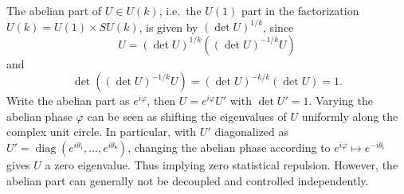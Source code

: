 \begin{remark}
  The abelian part of $U ∈ U(k)$, i.e.\ the $U(1)$ part in the factorization $U(k) = U(1) × SU(k)$, is given by $(\det U)^{1/k}$, since
  \begin{equation}
    U = (\det U)^{1/k} \left( (\det U)^{-1/k} U \right)
  \end{equation}
  and
  \begin{equation}
    \det \left( (\det U)^{-1/k} U \right) = (\det U)^{-k/k} (\det U) = 1.
  \end{equation}
  Write the abelian part as $e^{iφ}$, then $U = e^{iφ}U'$ with $\det U' = 1$. Varying the abelian phase $φ$ can be seen as shifting the eigenvalues of $U$ uniformly along the complex unit circle. In particular, with $U'$ diagonalized as $U' = \operatorname{diag}(e^{iθ₁}, …, e^{iθₖ})$, changing the abelian phase according to $e^{iφ} ↦ e^{-iθⱼ}$ gives $U$ a zero eigenvalue. Thus implying zero statistical repulsion. However, the abelian part can generally not be decoupled and controlled independently.
\end{remark}
